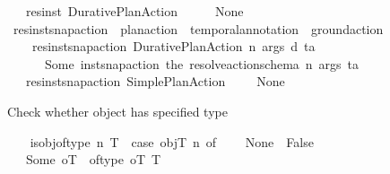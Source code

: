 \begin{isabellebody}
\ \ {\isacharbar}{\kern0pt}\ {\isachardoublequoteopen}res{\isacharunderscore}{\kern0pt}inst\ {\isacharparenleft}{\kern0pt}Durative{\isacharunderscore}{\kern0pt}Plan{\isacharunderscore}{\kern0pt}Action\ {\isacharunderscore}{\kern0pt}\ {\isacharunderscore}{\kern0pt}\ {\isacharunderscore}{\kern0pt}{\isacharparenright}{\kern0pt}\ {\isacharunderscore}{\kern0pt}\ {\isacharequal}{\kern0pt}\ None{\isachardoublequoteclose}\isanewline
\isanewline
\ \ \isanewline
\ \ \isamarkupfalse%
\ res{\isacharunderscore}{\kern0pt}inst{\isacharunderscore}{\kern0pt}snap{\isacharunderscore}{\kern0pt}action\ {\isacharcolon}{\kern0pt}{\isacharcolon}{\kern0pt}\ {\isachardoublequoteopen}plan{\isacharunderscore}{\kern0pt}action\ {\isasymRightarrow}\ temporal{\isacharunderscore}{\kern0pt}annotation\ {\isasymrightharpoonup}\ ground{\isacharunderscore}{\kern0pt}action{\isachardoublequoteclose}\ \isanewline
\ \ \ \ {\isachardoublequoteopen}res{\isacharunderscore}{\kern0pt}inst{\isacharunderscore}{\kern0pt}snap{\isacharunderscore}{\kern0pt}action\ {\isacharparenleft}{\kern0pt}Durative{\isacharunderscore}{\kern0pt}Plan{\isacharunderscore}{\kern0pt}Action\ n\ args\ d{\isacharparenright}{\kern0pt}\ ta\ {\isacharequal}{\kern0pt}\ \isanewline
\ \ \ \ \ \ Some\ {\isacharparenleft}{\kern0pt}inst{\isacharunderscore}{\kern0pt}snap{\isacharunderscore}{\kern0pt}action\ {\isacharparenleft}{\kern0pt}the\ {\isacharparenleft}{\kern0pt}resolve{\isacharunderscore}{\kern0pt}action{\isacharunderscore}{\kern0pt}schema\ n{\isacharparenright}{\kern0pt}{\isacharparenright}{\kern0pt}\ args\ ta{\isacharparenright}{\kern0pt}{\isachardoublequoteclose}\isanewline
\ \ {\isacharbar}{\kern0pt}\ {\isachardoublequoteopen}res{\isacharunderscore}{\kern0pt}inst{\isacharunderscore}{\kern0pt}snap{\isacharunderscore}{\kern0pt}action\ {\isacharparenleft}{\kern0pt}Simple{\isacharunderscore}{\kern0pt}Plan{\isacharunderscore}{\kern0pt}Action\ {\isacharunderscore}{\kern0pt}\ {\isacharunderscore}{\kern0pt}{\isacharparenright}{\kern0pt}\ {\isacharunderscore}{\kern0pt}\ {\isacharequal}{\kern0pt}\ None{\isachardoublequoteclose}%
\begin{isamarkuptext}%
Check whether object has specified type%
\end{isamarkuptext}\isamarkuptrue%
\ \ \isamarkupfalse%
\ {\isachardoublequoteopen}is{\isacharunderscore}{\kern0pt}obj{\isacharunderscore}{\kern0pt}of{\isacharunderscore}{\kern0pt}type\ n\ T\ {\isasymequiv}\ case\ objT\ n\ of\isanewline
\ \ \ \ None\ {\isasymRightarrow}\ False\isanewline
\ \ {\isacharbar}{\kern0pt}\ Some\ oT\ {\isasymRightarrow}\ of{\isacharunderscore}{\kern0pt}type\ oT\ T{\isachardoublequoteclose}%

\end{isabellebody}
